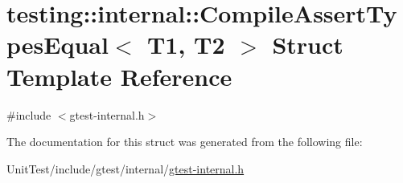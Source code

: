 \hypertarget{structtesting_1_1internal_1_1_compile_assert_types_equal}{\section{testing\+:\+:internal\+:\+:Compile\+Assert\+Types\+Equal$<$ T1, T2 $>$ Struct Template Reference}
\label{structtesting_1_1internal_1_1_compile_assert_types_equal}
}


{\ttfamily \#include $<$gtest-\/internal.\+h$>$}



The documentation for this struct was generated from the following file\+:\begin{DoxyCompactItemize}
\item 
Unit\+Test/include/gtest/internal/\hyperlink{gtest-internal_8h}{gtest-\/internal.\+h}\end{DoxyCompactItemize}
